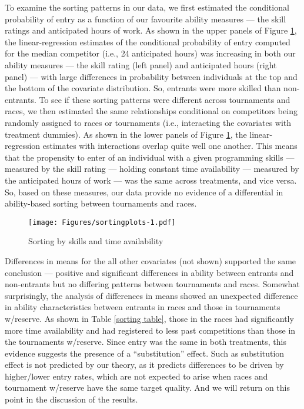 \documentclass[10pt, titlepage]{article}
\begin{document}
To examine the sorting patterns in our data, we first estimated the
conditional probability of entry as a function of our favourite ability
measures --- the skill ratings and anticipated hours of work. As shown
in the upper panels of Figure \ref{sorting plot}, the linear-regression
estimates of the conditional probability of entry computed for the
median competitor (i.e., 24 anticipated hours) was increasing in both
our ability measures --- the skill rating (left panel) and anticipated
hours (right panel) --- with large differences in probability between
individuals at the top and the bottom of the covariate distribution. So,
entrants were more skilled than non-entrants. To see if these sorting
patterns were different across tournaments and races, we then estimated
the same relationships conditional on competitors being randomly
assigned to races or tournaments (i.e., interacting the covariates with
treatment dummies). As shown in the lower panels of Figure
\ref{sorting plot}, the linear-regression estimates with interactions
overlap quite well one another. This means that the propensity to enter
of an individual with a given programming skills --- measured by the
skill rating --- holding constant time availability --- measured by the
anticipated hours of work --- was the same across treatments, and vice
versa. So, based on these measures, our data provide no evidence of a
differential in ability-based sorting between tournaments and races.

\begin{figure}
\caption{Sorting by skills and time availability}
\label{sorting plot}
\texttt{[image: Figures/sortingplots-1.pdf]}
\end{figure}

Differences in means for the all other covariates (not shown) supported
the same conclusion --- positive and significant differences in ability
between entrants and non-entrants but no differing patterns between
tournaments and races. Somewhat surprisingly, the analysis of
differences in means showed an unexpected difference in ability
characteristics between entrants in races and those in tournaments
w/reserve. As shown in Table \ref{sorting table}, those in the races had
significantly more time availability and had registered to less past
competitions than those in the tournaments w/reserve. Since entry was
the same in both treatments, this evidence suggests the presence of a
``substitution'' effect. Such as substitution effect is not predicted by
our theory, as it predicts differences to be driven by higher/lower
entry rates, which are not expected to arise when races and tournament
w/reserve have the same target quality. And we will return on this point
in the discussion of the results.
\end{document}

